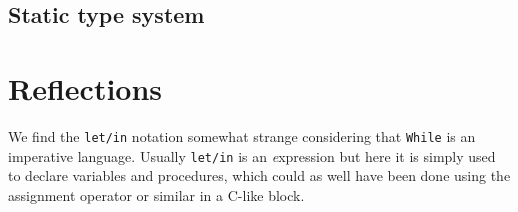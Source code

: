 \documentclass{article}
\begin{document}
\subsection{Static type system}
\label{sec:type}


\section{Reflections}
We find the {\tt let/in} notation somewhat strange considering that {\tt While} is an imperative language. Usually {\tt let/in} is an {\textit expression} but here it is simply used to declare variables and procedures, which could as well have been done using the assignment operator or similar in a C-like block.
\end{document}
